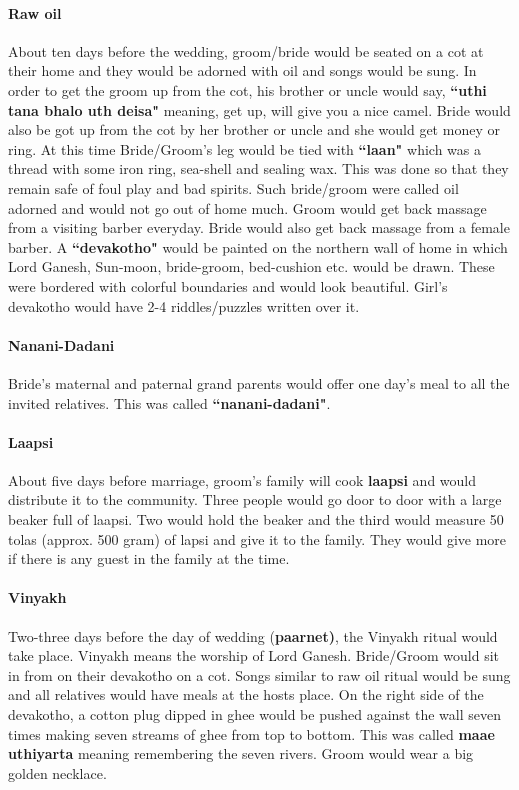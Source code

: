 \paragraph{Raw oil} About ten days before the wedding, groom/bride would be
seated on a cot at their home and they would be adorned with oil and songs
would be sung. In order to get the groom up from the cot, his brother or uncle
would say, \textbf{``uthi tana bhalo uth deisa"} meaning, get up, will give you
a nice camel. Bride would also be got up from the cot by her brother or uncle
and she would get money or ring. At this time Bride/Groom's leg would be tied
with \textbf{``laan"} which was a thread with some iron ring, sea-shell and
sealing wax. This was done so that they remain safe of foul play and bad
spirits. Such bride/groom were called oil adorned and would not go out of home
much. Groom would get back massage from a visiting barber everyday. Bride would
also get back massage from a female barber. A \textbf{``devakotho"} would be
painted on the northern wall of home in which Lord Ganesh, Sun-moon,
bride-groom, bed-cushion etc. would be drawn. These were bordered with colorful
boundaries and would look beautiful. Girl's devakotho would have 2-4
riddles/puzzles written over it.

\paragraph{Nanani-Dadani} Bride's maternal and paternal grand parents would
offer one day's meal to all the invited relatives. This was called
\textbf{``nanani-dadani"}.

\paragraph{Laapsi} About five days before marriage, groom's family will cook
\textbf{laapsi} and would distribute it to the community. Three people would go
door to door with a large beaker full of laapsi. Two would hold the beaker and
the third would measure 50 tolas (approx. 500 gram) of lapsi and give it to the
family. They would give more if there is any guest in the family at the time.

\paragraph{Vinyakh} Two-three days before the day of wedding (\textbf{paarnet)},
the Vinyakh ritual would take place. Vinyakh means the worship of Lord Ganesh.
Bride/Groom would sit in from on their devakotho on a cot. Songs similar to raw
oil ritual would be sung and all relatives would have meals at the hosts place.
On the right side of the devakotho, a cotton plug dipped in ghee would be
pushed against the wall seven times making seven streams of ghee from top to
bottom. This was called \textbf{maae uthiyarta} meaning remembering the seven
rivers. Groom would wear a big golden necklace.  

